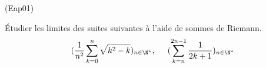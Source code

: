 \begin{tiny}(Eap01)\end{tiny}
\'Etudier les limites des suites suivantes à l'aide de sommes de Riemann.
\begin{displaymath}
(\frac{1}{n^{2}}\sum_{k=0}^{n}\sqrt{k^{2}-k})_{n\in \N^{*}},\hspace{0.5cm} 
(\sum_{k=n}^{2n-1}\frac{1}{2k+1})_{n\in \N^{*}}
\end{displaymath}

